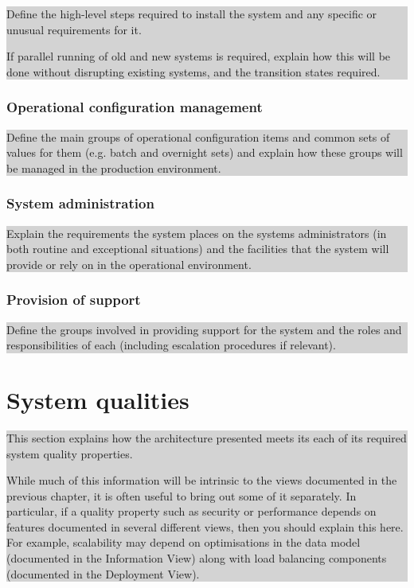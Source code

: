 \documentclass[a4paper,11pt]{report}
\newcommand{\instructions}[1]{
  \noindent\colorbox{lightgray}{%
    \parbox{\linewidth}{%
      #1
    }%
  }%
 \vspace{0.1cm}
}
\begin{document}
\instructions{
Define the high-level steps required to install the system and any
specific or unusual requirements for it.

If parallel running of old and new systems is required, explain how
this will be done without disrupting existing systems, and the
transition states required.
}

\subsection{Operational configuration management}
\label{sec:oper-conf-manag}

\instructions{
Define the main groups of operational configuration items and common
sets of values for them (e.g. batch and overnight sets) and explain
how these groups will be managed in the production environment.
}

\subsection{System administration}
\label{sec:syst-admin}

\instructions{
Explain the requirements the system places on the systems
administrators (in both routine and exceptional situations) and the
facilities that the system will provide or rely on in the operational
environment.
}

\subsection{Provision of support}
\label{sec:provision-support}

\instructions{
Define the groups involved in providing support for the system and the
roles and responsibilities of each (including escalation procedures if
relevant).
}

\chapter{System qualities}
\label{cha:system-qualities}
\thispagestyle{fancy}

\instructions{
This section explains how the architecture presented
  meets its each of its required system quality properties.

While much of this information will be intrinsic to the views
documented in the previous chapter, it is often useful to bring out
some of it separately. In particular, if a quality property such as
security or performance depends on features documented in several
different views, then you should explain this here. For example,
scalability may depend on optimisations in the data model (documented
in the Information View) along with load balancing components
(documented in the Deployment View).
}
\end{document}
